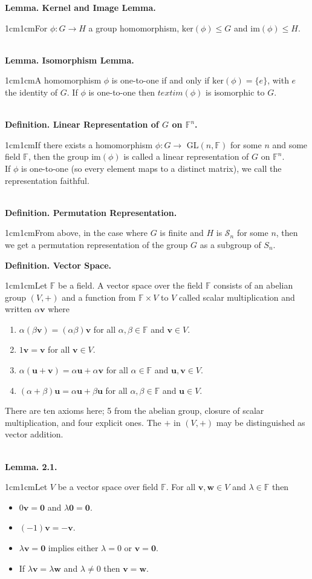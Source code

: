 \documentclass{article}
\newcommand{\vect}[1]{\mathbf{#1}}
\newcommand{\definition}[2]{\textbf{Definition. #1.}\begin{adjustwidth}{1cm}{1cm}#2\end{adjustwidth}}
\newcommand{\lemma}[2]{\textbf{Lemma. #1.}\begin{adjustwidth}{1cm}{1cm}#2\end{adjustwidth}}
\begin{document}
\lemma{Kernel and Image Lemma}{For $\phi : G \rightarrow H$ a group homomorphism, $\text{ker}(\phi) \leq G$ and $\text{im}(\phi) \leq H$.}~\\
\lemma{Isomorphism Lemma}{A homomorphism $\phi$ is one-to-one if and only if $\text{ker}(\phi) = \{e\}$, with $e$ the identity of $G$. If $\phi$ is one-to-one then $text{im}(\phi)$ is isomorphic to $G$.}~\\
\definition{Linear Representation of $G$ on $\mathbb{F}^n$}{If there exists a homomorphism $\phi : G \rightarrow$ GL$(n, \mathbb{F})$ for some $n$ and some field $\mathbb{F}$, then the group im$(\phi)$ is called a linear representation of $G$ on $\mathbb{F}^n$.\\If $\phi$ is one-to-one (so every element maps to a distinct matrix), we call the representation faithful.}~\\
\definition{Permutation Representation}{From above, in the case where $G$ is finite and $H$ is $\mathcal{S}_n$ for some $n$, then we get a permutation representation of the group $G$ as a subgroup of $S_n$.}\newpage
\definition{Vector Space}{Let $\mathbb{F}$ be a field. A vector space over the field $\mathbb{F}$ consists of an abelian group $(V, +)$ and a function from $\mathbb{F} \times V$ to $V$ called scalar multiplication and written $\alpha \vect{v}$ where \begin{enumerate} \item $\alpha(\beta \vect{v}) = (\alpha \beta)\vect{v}$ for all $\alpha, \beta \in \mathbb{F}$ and $\vect{v} \in V$. \item $1\vect{v} = \vect{v}$ for all $\vect{v} \in V$. \item $\alpha (\vect{u} + \vect{v}) = \alpha \vect{u} + \alpha \vect{v}$ for all $\alpha \in \mathbb{F}$ and $\vect{u}, \vect{v} \in V$. \item $(\alpha + \beta) \vect{u} = \alpha \vect{u} + \beta \vect{u}$ for all $\alpha, \beta \in \mathbb{F}$ and $\vect{u} \in V$.\end{enumerate}There are ten axioms here; 5 from the abelian group, closure of scalar multiplication, and four explicit ones. The $+$ in $(V, +)$ may be distinguished as vector addition.}~\\
\lemma{2.1}{Let $V$ be a vector space over field $\mathbb{F}$. For all $\vect{v}, \vect{w} \in V$ and $\lambda \in \mathbb{F}$ then \begin{itemize}
  \item $0\vect{v} = \vect{0}$ and $\lambda \vect{0} = \vect{0}$.
  \item $(-1)\vect{v} = -\vect{v}$.
  \item $\lambda \vect{v} = \vect{0}$ implies either $\lambda = 0$ or $\vect{v} = \vect{0}$.
  \item If $\lambda \vect{v} = \lambda \vect{w}$ and $\lambda \neq 0$ then $\vect{v} = \vect{w}$.
\end{itemize}}~\\
\end{document}

